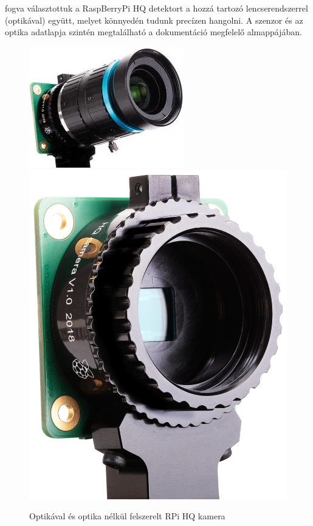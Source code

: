 \documentclass{article}
\begin{document}
fogva választottuk a RaspBerryPi HQ detektort a hozzá tartozó lencserendszerrel 
(optikával) együtt, melyet könnyedén tudunk precízen hangolni. A szenzor és az 
optika adatlapja szintén megtalálható a dokumentáció megfelelő almappájában.\\[5pt]
\begin{figure}[h]
    \centering
    \includegraphics[scale=1]{optika.png}
    \includegraphics[scale=0.1]{szenzor.jpg}
    \caption{Optikával és optika nélkül felszerelt RPi HQ kamera}
\end{figure}\\
\end{document}
